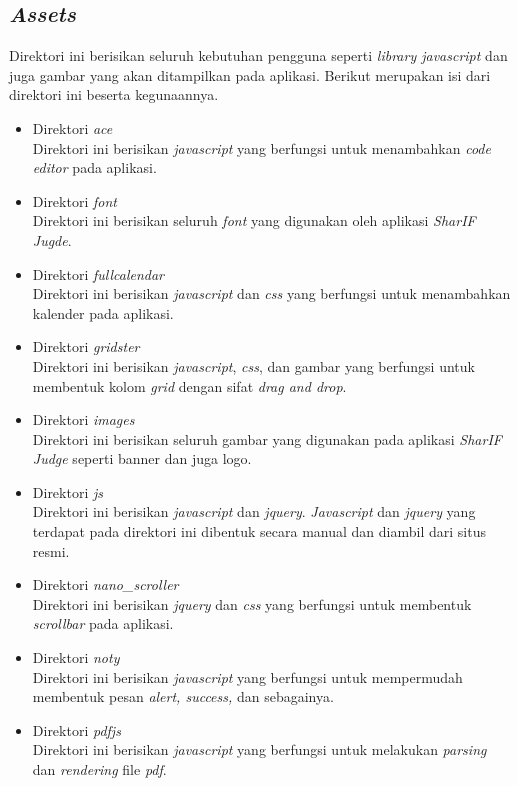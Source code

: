 \subsection{\textit{Assets}}
Direktori ini berisikan seluruh kebutuhan pengguna seperti \textit{library javascript} dan juga gambar yang akan ditampilkan pada aplikasi. Berikut merupakan isi dari direktori ini beserta kegunaannya.
\begin{itemize}
	\item Direktori \textit{ace} \\ Direktori ini berisikan \textit{javascript} yang berfungsi untuk menambahkan \textit{code editor} pada aplikasi.
	\item Direktori \textit{font} \\Direktori ini berisikan seluruh \textit{font} yang digunakan oleh aplikasi \textit{SharIF Jugde}.
	\item Direktori \textit{fullcalendar} \\Direktori ini berisikan \textit{javascript} dan \textit{css} yang berfungsi untuk menambahkan kalender pada aplikasi.
	\item Direktori \textit{gridster} \\Direktori ini berisikan \textit{javascript}, \textit{css}, dan gambar yang berfungsi untuk membentuk kolom \textit{grid} dengan sifat \textit{drag and drop}.
	\item Direktori \textit{images} \\Direktori ini berisikan seluruh gambar yang digunakan pada aplikasi \textit{SharIF Judge} seperti banner dan juga logo.
	\item Direktori \textit{js} \\Direktori ini berisikan \textit{javascript} dan \textit{jquery}. \textit{Javascript} dan \textit{jquery} yang terdapat pada direktori ini dibentuk secara manual dan diambil dari situs resmi.
	\item Direktori \textit{nano\_scroller} \\Direktori ini berisikan \textit{jquery} dan \textit{css} yang berfungsi untuk membentuk \textit{scrollbar} pada aplikasi.
	\item Direktori \textit{noty} \\Direktori ini berisikan \textit{javascript} yang berfungsi untuk mempermudah membentuk pesan \textit{alert, success,} dan sebagainya.
	\item Direktori \textit{pdfjs} \\Direktori ini berisikan \textit{javascript} yang berfungsi untuk melakukan \textit{parsing} dan \textit{rendering} file \textit{pdf}.

\end{itemize}
